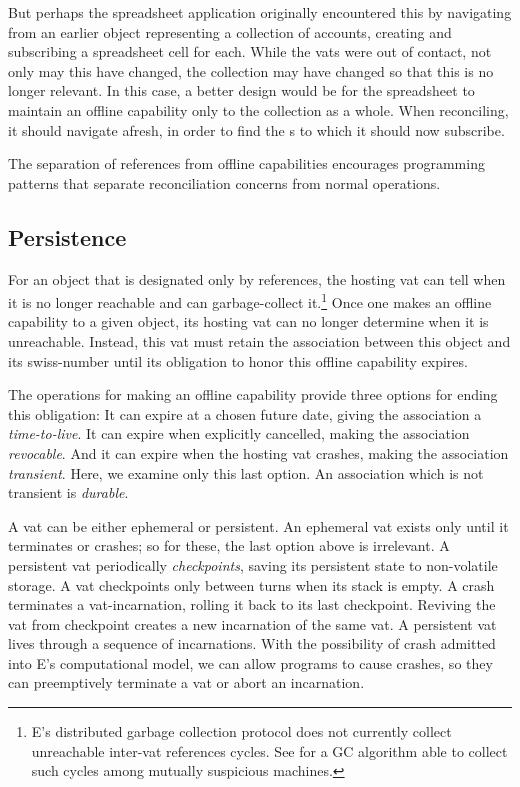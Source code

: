 \documentclass{llncs}
\begin{document}
But perhaps the spreadsheet application originally encountered this
 by navigating from an earlier object representing
a collection of accounts, creating and subscribing a spreadsheet cell
for each. While the vats were out of contact, not only may this
 have changed, the collection may have changed so
that this  is no longer relevant. In this case, a
better design would be for the spreadsheet to maintain an offline
capability only to the collection as a whole. When reconciling, it
should navigate afresh, in order to find the s to
which it should now subscribe.

The separation of references from offline capabilities encourages
programming patterns that separate reconciliation concerns from normal
operations.

\subsection{Persistence}

For an object that is designated only by references, the hosting vat
can tell when it is no longer reachable and can garbage-collect
it.\footnote{
%
E's distributed garbage collection protocol does not currently collect
unreachable inter-vat references cycles. See \cite{bejar:gc} for a
GC algorithm able to collect such cycles among mutually suspicious
machines.}
%
Once one makes an offline capability to a given object, its hosting vat
can no longer determine when it is unreachable. Instead, this vat must
retain the association between this object and its swiss-number until
its obligation to honor this offline capability expires.

The operations for making an offline capability provide three options
for ending this obligation: It can expire at a chosen future date,
giving the association a \emph{time-to-live}. It can expire when
explicitly cancelled, making the association \emph{revocable}. And it
can expire when the hosting vat crashes, making the association
\emph{transient}. Here, we examine only this last option. An
association which is not transient is \emph{durable}.

A vat can be either ephemeral or persistent. An ephemeral vat exists
only until it terminates or crashes; so for these, the last option
above is irrelevant. A persistent vat periodically \emph{checkpoints},
saving its persistent state to non-volatile storage. A vat checkpoints
only between turns when its stack is empty. A crash terminates a
vat-incarnation, rolling it back to its last checkpoint. Reviving the
vat from checkpoint creates a new incarnation of the same vat. A
persistent vat lives through a sequence of incarnations. With the
possibility of crash admitted into E's computational model, we can
allow programs to cause crashes, so they can preemptively terminate a
vat or abort an incarnation.
\end{document}
